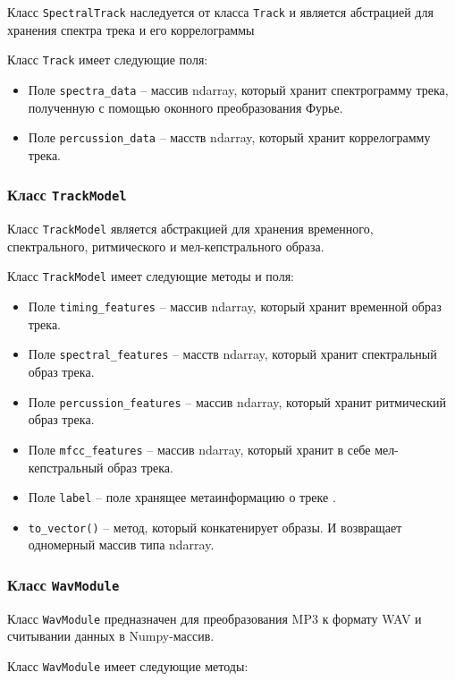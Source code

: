 Класс \texttt{SpectralTrack} наследуется от класса  \texttt{Track}  и  является абстрацией для хранения  спектра трека и его коррелограммы

Класс \texttt{Track} имеет следующие  поля:
\begin{itemize}
\item{Поле \texttt{spectra\_data} -- массив ndarray, который хранит спектрограмму трека, полученную с помощью оконного преобразования Фурье.}
\item{Поле \texttt{percussion\_data} -- масств ndarray, который хранит коррелограмму трека.}
\end{itemize}

\subsubsection{Класс \texttt{TrackModel}}

Класс \texttt{TrackModel} является абстракцией для хранения временного, спектрального, ритмического и мел-кепстрального образа.

Класс \texttt{TrackModel} имеет следующие  методы и поля:

\begin{itemize}
\item{Поле \texttt{timing\_features} -- массив ndarray, который хранит временной образ трека.}
\item{Поле \texttt{spectral\_features} -- масств ndarray, который хранит спектральный образ трека.}
\item{Поле \texttt{percussion\_features} -- массив ndarray, который хранит ритмический образ трека.}
\item{Поле \texttt{mfcc\_features} -- массив ndarray, который хранит в себе  мел-кепстральный образ трека.}
\item{Поле \texttt{label} -- поле хранящее метаинформацию о треке .}
\item{\texttt{to\_vector()} -- метод, который конкатенирует образы. И возвращает одномерный массив типа ndarray.}
\end{itemize}


\subsubsection{Класс \texttt{WavModule}}

Класс \texttt{WavModule} предназначен для преобразования MP3 к формату WAV и считывании данных в Numpy-массив. 

Класс \texttt{WavModule} имеет следующие методы:

